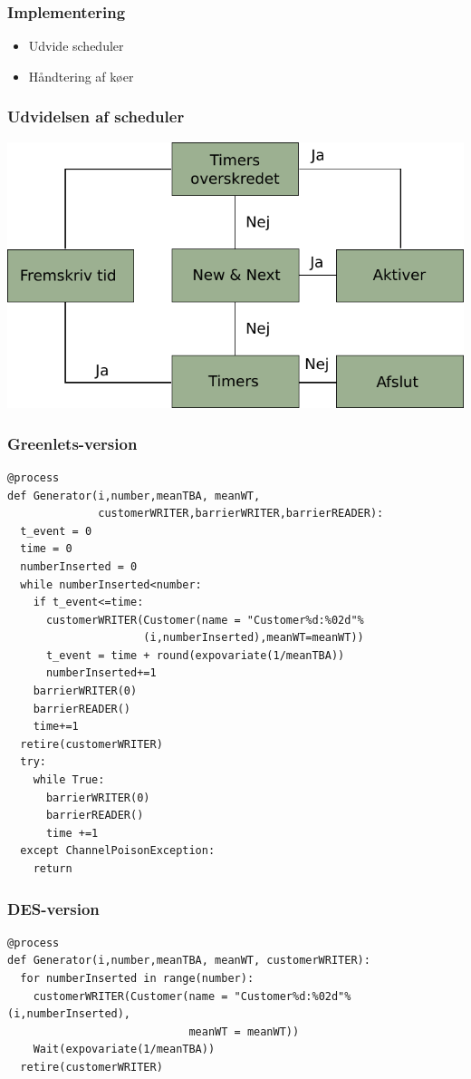 \documentclass[12pt]{beamer}
\begin{document}
\begin{frame}
\frametitle{Implementering}
  \begin{itemize}   
	\item Udvide scheduler
	\item Håndtering af køer
  \end{itemize}
\end{frame}
 
\begin{frame}
\frametitle{Udvidelsen af scheduler}
\includegraphics[scale=0.9]{des-scheduler} 
\end{frame}

\begin{frame}[fragile]
  \frametitle{Greenlets-version}
\begin{lstlisting}
@process
def Generator(i,number,meanTBA, meanWT,
              customerWRITER,barrierWRITER,barrierREADER):
  t_event = 0
  time = 0
  numberInserted = 0
  while numberInserted<number:
    if t_event<=time:
      customerWRITER(Customer(name = "Customer%d:%02d"%
                     (i,numberInserted),meanWT=meanWT))
      t_event = time + round(expovariate(1/meanTBA))
      numberInserted+=1
    barrierWRITER(0)
    barrierREADER()
    time+=1
  retire(customerWRITER)
  try:
    while True:
      barrierWRITER(0)
      barrierREADER()
      time +=1
  except ChannelPoisonException: 
    return
\end{lstlisting}
\end{frame}

\begin{frame}[fragile]
  \frametitle{DES-version}
\begin{lstlisting}
@process
def Generator(i,number,meanTBA, meanWT, customerWRITER):
  for numberInserted in range(number):
    customerWRITER(Customer(name = "Customer%d:%02d"%(i,numberInserted),
                            meanWT = meanWT))
    Wait(expovariate(1/meanTBA))
  retire(customerWRITER)
\end{lstlisting}
\end{frame}
\end{document}

